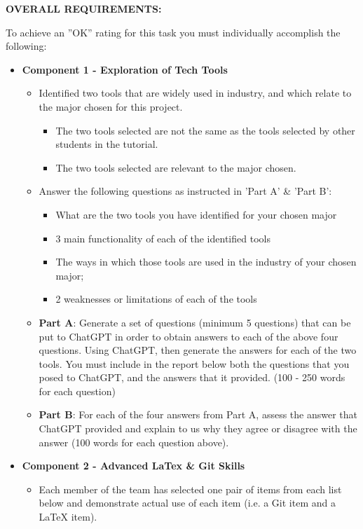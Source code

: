 \documentclass[a4paper, 11pt]{report}
\begin{document}
\textbf{OVERALL REQUIREMENTS:}

To achieve an ''OK'' rating for this task you must individually accomplish the following:
\begin{itemize}
\item \textbf{Component 1 - Exploration of Tech Tools}
	\begin{itemize}
	\item Identified two tools that are widely used in industry, and which relate to the major chosen for this project.
		\begin{itemize}
		\item The two tools selected are not the same as the tools selected by other students in the tutorial. 
		\item The two tools selected are relevant to the major chosen.
		\end{itemize}
	\item Answer the following questions as instructed in 'Part A' \& 'Part B':
		\begin{itemize}
		\item What are the two tools you have identified for your chosen major
		\item 3 main functionality of each of the identified tools
		\item The ways in which those tools are used in the industry of your chosen major;
		\item 2 weaknesses or limitations of each of the tools
		\end{itemize}
	\item \textbf{Part A}: Generate a set of questions (minimum 5 questions) that can be put to ChatGPT in order to obtain answers to each of the above four questions. Using ChatGPT, then generate the answers for each of the two tools. You must include in the report below both the questions that you posed to ChatGPT, and the answers that it provided. (100 - 250 words for each question)
	\item \textbf{Part B}: For each of the four answers from Part A, assess the answer that ChatGPT provided and explain to us why they agree or disagree with the answer (100 words for each question above).
	\end{itemize}
\item \textbf{Component 2 - Advanced LaTex \& Git Skills}
	\begin{itemize}
	\item Each member of the team has selected one pair of items from each list below and demonstrate actual use of each item (i.e. a Git item and a LaTeX item).

\end{itemize}
\end{itemize}
\end{document}
